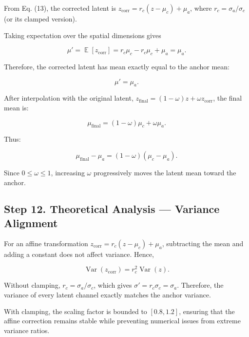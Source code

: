 \documentclass[12pt]{article}
\DeclareMathOperator{\Var}{Var}
\DeclareMathOperator{\E}{\mathbb{E}}
\begin{document}
From Eq. (13), the corrected latent is $z_{\mathrm{corr}} = r_c(z - \mu_c) + \mu_a$, where $r_c = \sigma_a/\sigma_c$ (or its clamped version).

Taking expectation over the spatial dimensions gives

\begin{equation}
\mu' = \E[z_{\mathrm{corr}}] = r_c\mu_c - r_c\mu_c + \mu_a = \mu_a.
\end{equation}

Therefore, the corrected latent has mean exactly equal to the anchor mean:

\begin{equation}
\boxed{\mu' = \mu_a}.
\end{equation}

After interpolation with the original latent, $z_{\mathrm{final}} = (1-\omega)z + \omega z_{\mathrm{corr}}$, the final mean is:

\begin{equation}
\mu_{\mathrm{final}} = (1-\omega)\mu_c + \omega\mu_a.
\end{equation}

Thus:

\begin{equation}
\boxed{\mu_{\mathrm{final}} - \mu_a = (1-\omega)(\mu_c - \mu_a)}.
\end{equation}

Since $0 \le \omega \le 1$, increasing $\omega$ progressively moves the latent mean toward the anchor.

\subsection{Step 12. Theoretical Analysis — Variance Alignment}

For an affine transformation $z_{\mathrm{corr}} = r_c(z - \mu_c) + \mu_a$, subtracting the mean and adding a constant does not affect variance. Hence,

\begin{equation}
\Var(z_{\mathrm{corr}}) = r_c^2 \Var(z).
\end{equation}

Without clamping, $r_c = \sigma_a/\sigma_c$, which gives $\sigma' = r_c\sigma_c = \sigma_a$. Therefore, the variance of every latent channel exactly matches the anchor variance.

With clamping, the scaling factor is bounded to $[0.8, 1.2]$, ensuring that the affine correction remains stable while preventing numerical issues from extreme variance ratios.
\end{document}
